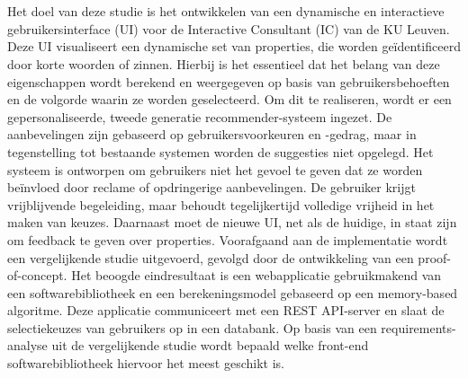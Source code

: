 

\section{}%
\label{sec:onderzoeksdoelstelling}
Het doel van deze studie is het ontwikkelen van een dynamische en interactieve gebruikersinterface (UI) voor de Interactive Consultant (IC) van de KU Leuven. Deze UI visualiseert een dynamische set van properties, die worden geïdentificeerd door korte woorden of zinnen. Hierbij is het essentieel dat het belang van deze eigenschappen wordt berekend en weergegeven op basis van gebruikersbehoeften en de volgorde waarin ze worden geselecteerd. Om dit te realiseren, wordt er een gepersonaliseerde, tweede generatie recommender-systeem ingezet. De aanbevelingen zijn gebaseerd op gebruikersvoorkeuren en -gedrag, maar in tegenstelling tot bestaande systemen worden de suggesties niet opgelegd. Het systeem is ontworpen om gebruikers niet het gevoel te geven dat ze worden beïnvloed door reclame of opdringerige aanbevelingen. De gebruiker krijgt vrijblijvende begeleiding, maar behoudt tegelijkertijd volledige vrijheid in het maken van keuzes. Daarnaast moet de nieuwe UI, net als de huidige, in staat zijn om feedback te geven over properties. Voorafgaand aan de implementatie wordt een vergelijkende studie uitgevoerd, gevolgd door de ontwikkeling van een proof-of-concept. Het beoogde eindresultaat is een webapplicatie gebruikmakend van een softwarebibliotheek en een berekeningsmodel gebaseerd op een memory-based algoritme. Deze applicatie communiceert met een REST API-server en slaat de selectiekeuzes van gebruikers op in een databank. Op basis van een requirements-analyse uit de vergelijkende studie wordt bepaald welke front-end softwarebibliotheek hiervoor het meest geschikt is.


